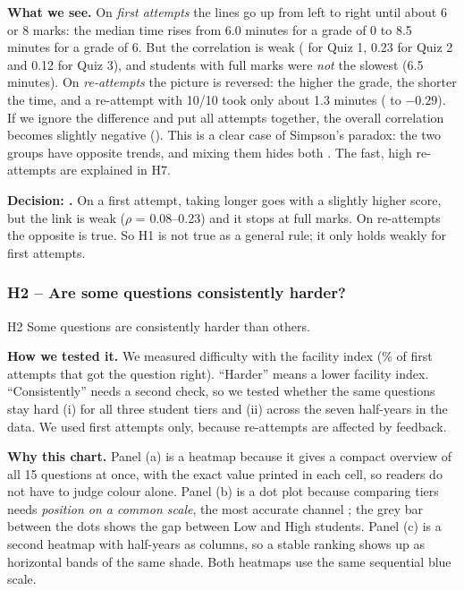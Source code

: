 \textbf{What we see.} On \emph{first attempts} the lines go up from left to
right until about 6 or 8 marks: the median time rises from 6.0 minutes for a
grade of 0 to 8.5 minutes for a grade of 6. But the correlation is weak
( for Quiz 1, 0.23 for Quiz 2 and 0.12 for Quiz 3), and students
with full marks were \emph{not} the slowest (6.5 minutes). On
\emph{re-attempts} the picture is reversed: the higher the grade, the shorter
the time, and a re-attempt with 10/10 took only about 1.3 minutes (
to $-0.29$). If we ignore the difference and put all attempts together, the
overall correlation becomes slightly negative (). This is a clear
case of Simpson's paradox: the two groups have opposite trends, and mixing them
hides both \citep{simpson1951interpretation}. The fast, high re-attempts are
explained in H7.

\begin{decision}
\textbf{Decision: \partly.} On a first attempt, taking longer goes with a
slightly higher score, but the link is weak ($\rho$ = 0.08--0.23) and it stops
at full marks. On re-attempts the opposite is true. So H1 is not true as a
general rule; it only holds weakly for first attempts.
\end{decision}

\subsubsection{H2 -- Are some questions consistently harder?}
\label{sec:h2}

\begin{hyp}{H2}
Some questions are consistently harder than others.
\end{hyp}

\textbf{How we tested it.} We measured difficulty with the facility index (\%
of first attempts that got the question right). ``Harder'' means a lower
facility index. ``Consistently'' needs a second check, so we tested whether the
same questions stay hard (i) for all three student tiers and (ii) across
the seven half-years in the data. We used first attempts only, because
re-attempts are affected by feedback.

\textbf{Why this chart.} Panel (a) is a heatmap because it gives a compact
overview of all 15 questions at once, with the exact value printed in each
cell, so readers do not have to judge colour alone. Panel (b) is a dot plot
because comparing tiers needs \emph{position on a common scale}, the most
accurate channel \citep{cleveland1984graphical}; the grey bar between the dots
shows the gap between Low and High students. Panel (c) is a second heatmap
with half-years as columns, so a stable ranking shows up as horizontal bands of
the same shade. Both heatmaps use the same sequential blue scale.

